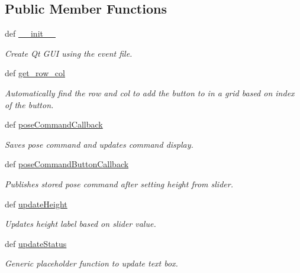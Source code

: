 \subsection*{Public Member Functions}
\begin{DoxyCompactItemize}
\item 
def \hyperlink{classaerial__autonomy_1_1aerial__autonomy__gui_1_1EventTransmissionGUI_a6b65594c62caf4c8cedfbd9f12168dfb}{\-\_\-\-\_\-init\-\_\-\-\_\-}
\begin{DoxyCompactList}\small\item\em Create Qt G\-U\-I using the event file. \end{DoxyCompactList}\item 
def \hyperlink{classaerial__autonomy_1_1aerial__autonomy__gui_1_1EventTransmissionGUI_a10f2fd3747b7f899efde6ff0c67d95b6}{get\-\_\-row\-\_\-col}
\begin{DoxyCompactList}\small\item\em Automatically find the row and col to add the button to in a grid based on index of the button. \end{DoxyCompactList}\item 
def \hyperlink{classaerial__autonomy_1_1aerial__autonomy__gui_1_1EventTransmissionGUI_a9b9a66142bcd76a1be23682c7fdd424a}{pose\-Command\-Callback}
\begin{DoxyCompactList}\small\item\em Saves pose command and updates command display. \end{DoxyCompactList}\item 
def \hyperlink{classaerial__autonomy_1_1aerial__autonomy__gui_1_1EventTransmissionGUI_ae276f79545a8707c09bf07cf51132ef7}{pose\-Command\-Button\-Callback}
\begin{DoxyCompactList}\small\item\em Publishes stored pose command after setting height from slider. \end{DoxyCompactList}\item 
def \hyperlink{classaerial__autonomy_1_1aerial__autonomy__gui_1_1EventTransmissionGUI_aaa8ae13ff7e5ad9128ae565cecd49427}{update\-Height}
\begin{DoxyCompactList}\small\item\em Updates height label based on slider value. \end{DoxyCompactList}\item 
def \hyperlink{classaerial__autonomy_1_1aerial__autonomy__gui_1_1EventTransmissionGUI_a21d7d7031e8de77b2e31e7edb5936a34}{update\-Status}
\begin{DoxyCompactList}\small\item\em Generic placeholder function to update text box. \end{DoxyCompactList}\end{DoxyCompactItemize}
